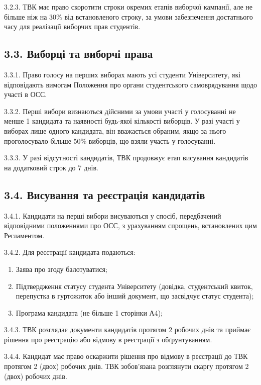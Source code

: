     3.2.3. ТВК має право скоротити строки окремих етапів виборчої кампанії, але не більше ніж на 30\% від встановленого строку, за умови забезпечення достатнього часу для реалізації виборчих прав студентів.

\subsection*{3.3. Виборці та виборчі права}
    3.3.1. Право голосу на перших виборах мають усі студенти Університету, які відповідають вимогам Положення про органи студентського самоврядування щодо участі в ОСС.

    3.3.2. Перші вибори визнаються дійсними за умови участі у голосуванні не менше 1 кандидата та наявності будь-якої кількості виборців. У разі участі у виборах лише одного кандидата, він вважається обраним, якщо за нього проголосувало більше 50\% виборців, що взяли участь у голосуванні.

    3.3.3. У разі відсутності кандидатів, ТВК продовжує етап висування кандидатів на додатковий строк до 7 днів.

\subsection*{3.4. Висування та реєстрація кандидатів}
    3.4.1. Кандидати на перші вибори висуваються у спосіб, передбачений відповідними положеннями про ОСС, з урахуванням спрощень, встановлених цим Регламентом.

    3.4.2. Для реєстрації кандидата подаються:

        \begin{enumerate}[label=\alph*)]
            \item Заява про згоду балотуватися;
            \item Підтвердження статусу студента Університету (довідка, студентський квиток, перепустка в гуртожиток або інший документ, що засвідчує статус студента);
            \item Програма кандидата (не більше 1 сторінки А4);
        \end{enumerate}

    3.4.3. ТВК розглядає документи кандидатів протягом 2 робочих днів та приймає рішення про реєстрацію або відмову в реєстрації з обґрунтуванням.

    3.4.4. Кандидат має право оскаржити рішення про відмову в реєстрації до ТВК протягом 2 (двох) робочих днів. ТВК зобов'язана розглянути скаргу протягом 2 (двох) робочих днів.

